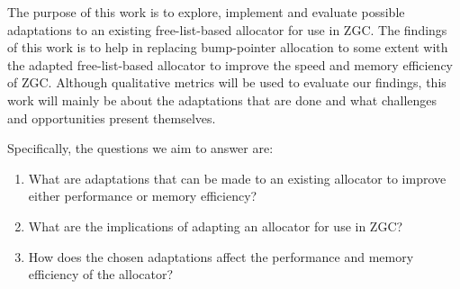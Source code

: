 


The purpose of this work is to explore, implement and evaluate possible adaptations to an existing free-list-based allocator for use in ZGC. The findings of this work is to help in replacing bump-pointer allocation to some extent with the adapted free-list-based allocator to improve the speed and memory efficiency of ZGC. Although qualitative metrics will be used to evaluate our findings, this work will mainly be about the adaptations that are done and what challenges and opportunities present themselves.

Specifically, the questions we aim to answer are:

\begin{enumerate}
    \item What are adaptations that can be made to an existing allocator to improve either performance or memory efficiency?
    \item What are the implications of adapting an allocator for use in ZGC?
    \item How does the chosen adaptations affect the performance and memory efficiency of the allocator?
\end{enumerate}


